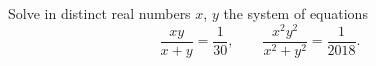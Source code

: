 Solve in distinct real numbers $x$, $y$ the system of equations
\[
\dfrac{xy}{x+y}=\dfrac{1}{30},\qquad\dfrac{x^2y^2}{x^2+y^2}=\dfrac{1}{2018}.
\]
